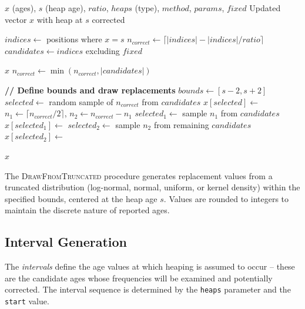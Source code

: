 \documentclass[pdflatex,sn-mathphys-num]{sn-jnl}%
\theoremstyle{thmstyleone}%
\theoremstyle{thmstyletwo}%
\theoremstyle{thmstylethree}%
\begin{document}
\begin{algorithm}
\small
\caption{Correct Single Heap}\label{alg:correctSingleHeap}
\begin{algorithmic}[1]
\Require $x$ (ages), $s$ (heap age), $ratio$, $heaps$ (type), $method$, $params$, $fixed$
\Ensure Updated vector $x$ with heap at $s$ corrected

\State $indices \gets$ positions where $x = s$
\State $n_{correct} \gets \lceil |indices| - |indices| / ratio \rceil$
\State $candidates \gets indices$ excluding $fixed$

 \Return $x$ \EndIf
\State $n_{correct} \gets \min(n_{correct}, |candidates|)$

\State \textbf{// Define bounds and draw replacements}
    \State $bounds \gets [s - 2, s + 2]$
    \State $selected \gets$ random sample of $n_{correct}$ from $candidates$
    \State $x[selected] \gets$ 
    \State $n_1 \gets \lceil n_{correct} / 2 \rceil$, \quad $n_2 \gets n_{correct} - n_1$
    \State $selected_1 \gets$ sample $n_1$ from $candidates$
    \State $x[selected_1] \gets$ 
    \State $selected_2 \gets$ sample $n_2$ from remaining $candidates$
    \State $x[selected_2] \gets$ 
\EndIf

\State \Return $x$
\end{algorithmic}
\end{algorithm}

\normalsize

The \textsc{DrawFromTruncated} procedure generates replacement values from a truncated distribution (log-normal, normal, uniform, or kernel density) within the specified bounds, centered at the heap age $s$. Values are rounded to integers to maintain the discrete nature of reported ages.


\subsection{Interval Generation}

The \emph{intervals} define the age values at which heaping is assumed to occur -- these are the candidate ages whose frequencies will be examined and potentially corrected. The interval sequence is determined by the \texttt{heaps} parameter and the \texttt{start} value.
\end{document}
